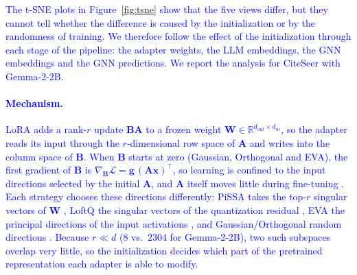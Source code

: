 \documentclass[a4paper,fleqn]{cas-sc}
\newcommand{\revtwo}[1]{\textcolor{blue}{#1}}  %
\begin{document}
\revtwo{The t-SNE plots in Figure~\ref{fig:tsne} show that the five views differ, but they cannot tell whether the difference is caused by the initialization or by the randomness of training. We therefore follow the effect of the initialization through each stage of the pipeline: the adapter weights, the LLM embeddings, the GNN embeddings and the GNN predictions. We report the analysis for CiteSeer with Gemma-2-2B.}

\paragraph{\revtwo{Mechanism.}}
\revtwo{LoRA adds a rank-$r$ update $\mathbf{B}\mathbf{A}$ to a frozen weight $\mathbf{W}\in\mathbb{R}^{d_{out}\times d_{in}}$, so the adapter reads its input through the $r$-dimensional row space of $\mathbf{A}$ and writes into the column space of $\mathbf{B}$. When $\mathbf{B}$ starts at zero (Gaussian, Orthogonal and EVA), the first gradient of $\mathbf{B}$ is $\nabla_{\mathbf{B}}\mathcal{L}=\mathbf{g}\,(\mathbf{A}\mathbf{x})^{\top}$, so learning is confined to the input directions selected by the initial $\mathbf{A}$, and $\mathbf{A}$ itself moves little during fine-tuning \citep{zhu2024asymmetry}. Each strategy chooses these directions differently: PiSSA takes the top-$r$ singular vectors of $\mathbf{W}$ \citep{meng2024pissa}, LoftQ the singular vectors of the quantization residual \citep{li2023loftq}, EVA the principal directions of the input activations \citep{paischer2024eva}, and Gaussian/Orthogonal random directions \citep{Hu2021LoRA, zhang2025orthogonal}. Because $r\ll d$ ($8$ vs.\ $2304$ for Gemma-2-2B), two such subspaces overlap very little, so the initialization decides which part of the pretrained representation each adapter is able to modify.}
\end{document}
